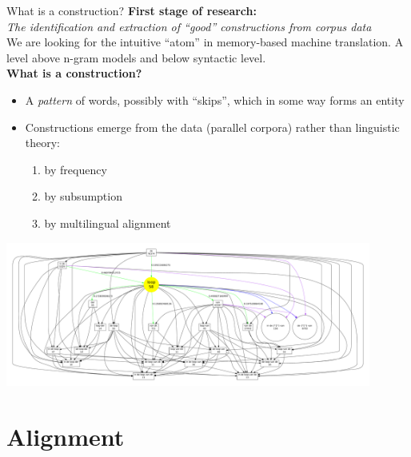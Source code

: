 \documentclass[compress]{beamer}
\begin{document}
\begin{frame}
	\begin{block}{What is a construction?}
		\textbf{First stage of research:}  \\
		\emph{The identification and extraction of ``good'' constructions from corpus data} \\
		We are looking for the intuitive ``atom'' in memory-based machine translation. A level above n-gram models and below syntactic level. \\
		\smallskip
		\textbf{What is a construction?}  \\
		\begin{itemize}
			\item A \emph{pattern} of words, possibly with ``skips'', which in some way forms an entity
			\item Constructions emerge from the data (parallel corpora) rather than linguistic theory:
			\begin{enumerate}
				\item by frequency
				\item by subsumption
				\item by multilingual alignment
			\end{enumerate}
		\end{itemize}
	\end{block}
\end{frame}

\begin{frame}
	\includegraphics[width=120.0mm]{patterngraph4.pdf}
\end{frame}


\section{Alignment}
\end{document}
